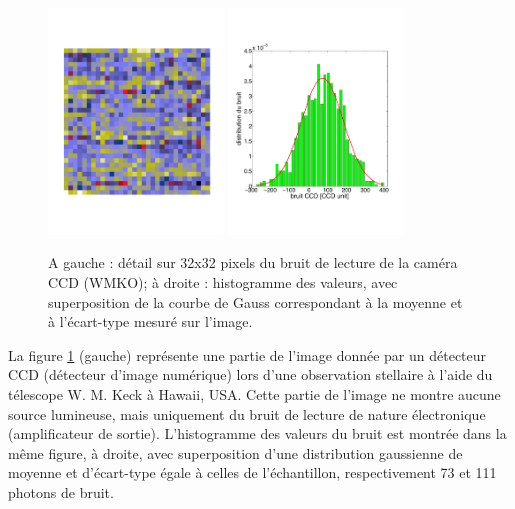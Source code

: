 \begin{figure}[t]
   \centering
   \includegraphics[height=6cm]{assets/figures/Serie2_exe10fig1.pdf}\hspace{10mm}
   \includegraphics[height=6cm]{assets/figures/Serie2_exe10fig2.pdf}
   \caption{A gauche : détail sur 32x32 pixels du bruit de lecture de la caméra CCD (WMKO); à droite : histogramme des valeurs, avec superposition de la courbe de Gauss correspondant à la moyenne et à l'écart-type mesuré sur l'image.}
   \label{fig:exe16}
\end{figure}

La figure \ref{fig:exe16} (gauche) représente une partie de l'image donnée par un détecteur CCD (détecteur d'image numérique) lors d'une observation stellaire à l'aide du télescope W. M. Keck à Hawaii, USA. Cette partie de l'image ne montre aucune source lumineuse, mais uniquement du bruit de lecture de nature électronique (amplificateur de sortie). L'histogramme des valeurs du bruit est montrée dans la même figure, à droite, avec superposition d'une distribution gaussienne de moyenne et d'écart-type égale à celles de l'échantillon, respectivement 73 et 111 photons de bruit.

